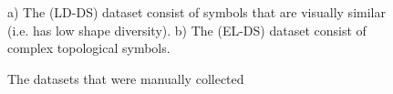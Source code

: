 \documentclass[preprint,10pt,5p,twocolumn]{elsarticle}
\begin{document}
 \begin{figure}
			\hfill
 	
	\caption{The datasets that were manually collected}  a)  The (LD-DS) dataset consist of symbols that are visually similar (i.e. has low shape diversity). b) The (EL-DS) dataset consist of complex topological symbols. 
\end{figure}
\end{document}
